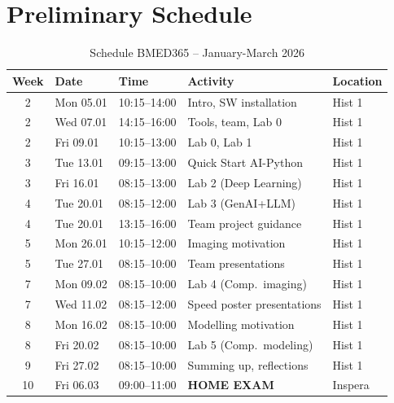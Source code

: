 \documentclass[11pt,a4paper]{article}
\begin{document}
\section{Preliminary Schedule}

\begin{table}[htbp]
\centering
\caption{Schedule BMED365 -- January-March 2026}
\label{tab:schedule}
\begin{tabular}{@{}cllll@{}}
\toprule
\textbf{Week} & \textbf{Date} & \textbf{Time} & \textbf{Activity} & \textbf{Location} \\
\midrule
2 & Mon 05.01 & 10:15--14:00 & Intro, SW installation & Hist 1 \\
2 & Wed 07.01 & 14:15--16:00 & Tools, team, Lab 0 & Hist 1 \\
2 & Fri 09.01 & 10:15--13:00 & Lab 0, Lab 1 & Hist 1 \\
3 & Tue 13.01 & 09:15--13:00 & Quick Start AI-Python & Hist 1 \\
3 & Fri 16.01 & 08:15--13:00 & Lab 2 (Deep Learning) & Hist 1 \\
4 & Tue 20.01 & 08:15--12:00 & Lab 3 (GenAI+LLM) & Hist 1 \\
4 & Tue 20.01 & 13:15--16:00 & Team project guidance & Hist 1 \\
5 & Mon 26.01 & 10:15--12:00 & Imaging motivation & Hist 1 \\
5 & Tue 27.01 & 08:15--10:00 & Team presentations & Hist 1 \\
7 & Mon 09.02 & 08:15--10:00 & Lab 4 (Comp.\ imaging) & Hist 1 \\
7 & Wed 11.02 & 08:15--12:00 & Speed poster presentations & Hist 1 \\
8 & Mon 16.02 & 08:15--10:00 & Modelling motivation & Hist 1 \\
8 & Fri 20.02 & 08:15--10:00 & Lab 5 (Comp.\ modeling) & Hist 1 \\
9 & Fri 27.02 & 08:15--10:00 & Summing up, reflections & Hist 1 \\
10 & Fri 06.03 & 09:00--11:00 & \textbf{HOME EXAM} & Inspera \\
\bottomrule
\end{tabular}
\end{table}

\end{document}
